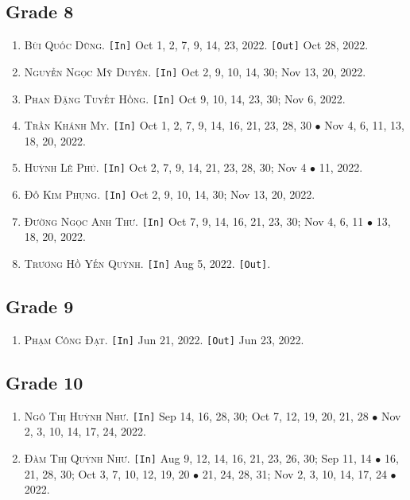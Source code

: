\documentclass{article}
\numberwithin{equation}{section}
\begin{document}
\subsection{Grade 8}
\begin{enumerate}
	\item \textsc{Bùi Quốc Dũng.} \texttt{[In]} Oct 1, 2, 7, 9, 14, 23, 2022. \texttt{[Out]} Oct 28, 2022.
	\item \textsc{Nguyễn Ngọc Mỹ Duyên.} \texttt{[In]} Oct 2, 9, 10, 14, 30; Nov 13, 20, 2022.
	\item \textsc{Phan Đặng Tuyết Hồng.} \texttt{[In]} Oct 9, 10, 14, 23, 30; Nov 6, 2022.
	\item \textsc{Trần Khánh My.} \texttt{[In]} Oct 1, 2, 7, 9, 14, 16, 21, 23, 28, 30 $\bullet$ Nov 4, 6, 11, 13, 18, 20, 2022.
	\item \textsc{Huỳnh Lê Phú.} \texttt{[In]} Oct 2, 7, 9, 14, 21, 23, 28, 30; Nov 4 $\bullet$ 11, 2022.
	\item \textsc{Đỗ Kim Phụng.} \texttt{[In]} Oct 2, 9, 10, 14, 30; Nov 13, 20, 2022.
	\item \textsc{Đường Ngọc Anh Thư.} \texttt{[In]} Oct 7, 9, 14, 16, 21, 23, 30; Nov 4, 6, 11 $\bullet$ 13, 18, 20, 2022.
	\item \textsc{Trương Hồ Yến Quỳnh.} \texttt{[In]} Aug 5, 2022. \texttt{[Out]}.
\end{enumerate}

\subsection{Grade 9}
\begin{enumerate}
	\item \textsc{Phạm Công Đạt.} \texttt{[In]} Jun 21, 2022. \texttt{[Out]} Jun 23, 2022.
\end{enumerate}

\subsection{Grade 10}
\begin{enumerate}
	\item \textsc{Ngô Thị Huỳnh Như.} \texttt{[In]} Sep 14, 16, 28, 30; Oct 7, 12, 19, 20, 21, 28 $\bullet$ Nov 2, 3, 10, 14, 17, 24, 2022.
	\item \textsc{Đàm Thị Quỳnh Như.} \texttt{[In]} Aug 9, 12, 14, 16, 21, 23, 26, 30; Sep 11, 14 $\bullet$ 16, 21, 28, 30; Oct 3, 7, 10, 12, 19, 20 $\bullet$ 21, 24, 28, 31; Nov 2, 3, 10, 14, 17, 24 $\bullet$ 2022.
\end{enumerate}
\end{document}
